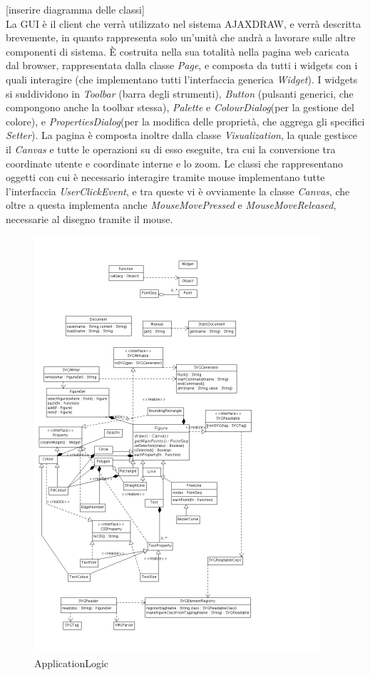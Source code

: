 [inserire diagramma delle classi] \\
La GUI \` e  il client che verr\` a utilizzato nel sistema AJAXDRAW, e verr\` a descritta brevemente, in quanto rappresenta solo un'unit\` a che andr\`  a a lavorare sulle altre componenti di sistema. \` E costruita nella sua totalit\` a nella pagina web caricata dal browser, rappresentata dalla classe \textit{Page}, e composta da tutti i widgets con i quali interagire (che implementano tutti l'interfaccia generica \textit{Widget}).  I widgets si suddividono in \textit{Toolbar} (barra degli strumenti), \textit{Button} (pulsanti generici, che compongono anche la toolbar stessa), \textit{Palette} e \textit{ColourDialog}(per la gestione del colore), e \textit{PropertiesDialog}(per la modifica delle propriet\` a, che aggrega gli specifici \textit{Setter}). La pagina \` e composta inoltre dalla classe \textit{Visualization}, la quale gestisce il \textit{Canvas} e tutte le operazioni su di esso eseguite, tra cui la conversione tra coordinate utente e coordinate interne e lo zoom. Le classi che rappresentano oggetti con cui \`e necessario interagire tramite mouse implementano tutte l'interfaccia \textit{UserClickEvent}, e tra queste vi \` e ovviamente la classe \textit{Canvas}, che oltre a questa implementa anche \textit{MouseMovePressed} e \textit{MouseMoveReleased}, necessarie al disegno tramite il mouse.  

\begin{figure}[!ht]
\centering
\includegraphics{applogic.jpg}
\caption{ApplicationLogic}
\end{figure}

